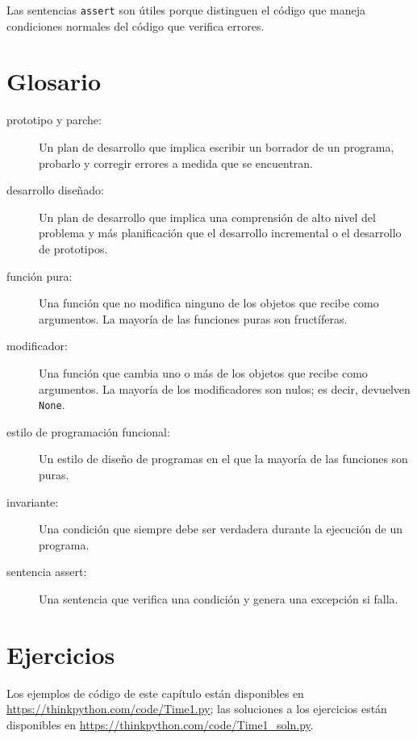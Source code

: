 Las sentencias \texttt{assert} son útiles porque distinguen el código que maneja condiciones normales del código que verifica errores.

\section{Glosario}

\begin{description}
\item[prototipo y parche:] Un plan de desarrollo que implica escribir un borrador de un programa, probarlo y corregir errores a medida que se encuentran.
\item[desarrollo diseñado:] Un plan de desarrollo que implica una comprensión de alto nivel del problema y más planificación que el desarrollo incremental o el desarrollo de prototipos.
\item[función pura:] Una función que no modifica ninguno de los objetos que recibe como argumentos. La mayoría de las funciones puras son fructíferas.
\item[modificador:] Una función que cambia uno o más de los objetos que recibe como argumentos. La mayoría de los modificadores son nulos; es decir, devuelven \texttt{None}.
\item[estilo de programación funcional:] Un estilo de diseño de programas en el que la mayoría de las funciones son puras.
\item[invariante:] Una condición que siempre debe ser verdadera durante la ejecución de un programa.
\item[sentencia assert:] Una sentencia que verifica una condición y genera una excepción si falla.
\end{description}

\section{Ejercicios}

Los ejemplos de código de este capítulo están disponibles en \url{https://thinkpython.com/code/Time1.py}; las soluciones a los ejercicios están disponibles en \url{https://thinkpython.com/code/Time1_soln.py}.


